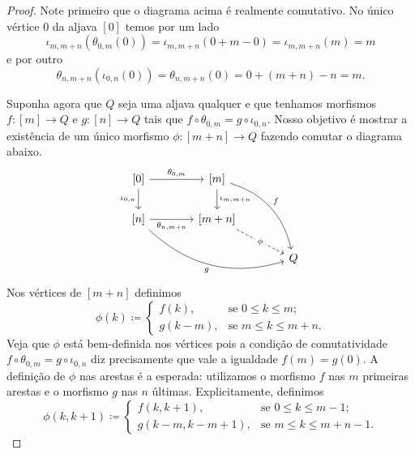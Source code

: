 \begin{proof}
    Note primeiro que o diagrama acima é realmente comutativo.
    No único vértice $0$ da aljava $[0]$ temos por um lado
    \begin{displaymath}
        \iota_{m,m+n}(\theta_{0,m}(0))
        = \iota_{m,m+n}(0+m-0)
        = \iota_{m,m+n}(m)
        = m
    \end{displaymath}
    e por outro
    \begin{displaymath}
        \theta_{n,m+n}(\iota_{0,n}(0))
        = \theta_{n,m+n}(0)
        = 0 + (m+n) - n
        = m.
    \end{displaymath}

    Suponha agora que $Q$ seja uma aljava qualquer e que tenhamos morfismos $f: [m] \to Q$ e $g: [n] \to Q$ tais que $f \circ \theta_{0,m} = g \circ \iota_{0,n}$.
    Nosso objetivo é mostrar a existência de um único morfismo $\phi: [m+n] \to Q$ fazendo comutar o diagrama abaixo.
    \begin{displaymath}
        \begin{tikzcd}[column sep=1.35cm]
            {[0]}
            \arrow[r,"{\theta_{0,m}}"]
            \arrow[d, "{\iota_{0,n}}" swap]
            & {[m]}
            \arrow[d, "{\iota_{m,m+n}}"]
            \arrow[rdd, bend left=30, "f"]
            \\ {[n]}
            \arrow[r, "{\theta_{n,m+n}}" swap]
            \arrow[rrd, bend right=30, "g" swap]
            & {[m+n]}
            \arrow[rd, dashed, "\phi" description]
            \\ & & Q
        \end{tikzcd}
    \end{displaymath}
    Nos vértices de $[m+n]$ definimos
    \begin{displaymath}
        \phi(k) \coloneqq
        \begin{cases}
            f(k), & \text{se } 0 \leq k \leq m; \\
            g(k-m), & \text{se } m \leq k \leq m+n.
        \end{cases}
    \end{displaymath}
    Veja que $\phi$ está bem-definida nos vértices pois a condição de comutatividade $f \circ \theta_{0,m} = g \circ \iota_{0,n}$ diz precisamente que vale a igualdade $f(m) = g(0)$.
    A definição de $\phi$ nas arestas é a esperada: utilizamos o morfismo $f$ nas $m$ primeiras arestas e o morfismo $g$ nas $n$ últimas.
    Explicitamente, definimos
    \begin{displaymath}
        \phi(k,k+1) \coloneqq
        \begin{cases}
            f(k,k+1), & \text{se } 0 \leq k \leq m-1; \\
            g(k-m,k-m+1), & \text{se } m \leq k \leq m+n-1.
        \end{cases}
    \end{displaymath}


\end{proof}
